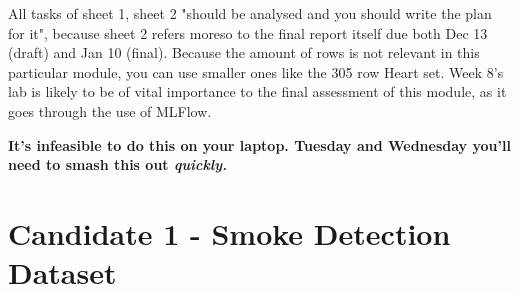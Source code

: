 \documentclass[12pt]{report}
\begin{document}
All tasks of sheet 1, sheet 2 "should be analysed and you should write the plan for it", because sheet 2
refers moreso to the final report itself due both Dec 13 (draft) and Jan 10 (final).
Because the amount of rows is not relevant in this particular module, you can use smaller ones 
like the 305 row Heart set.
Week 8's lab is likely to be of vital importance to the final assessment of this module, as it 
goes through the use of MLFlow. 

\textbf{It's infeasible to do this on your laptop. Tuesday and Wednesday you'll need to smash this out
\textit{quickly.}}

\section{Candidate 1 - Smoke Detection Dataset}
\end{document}
